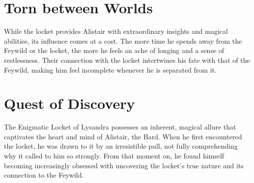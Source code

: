 \documentclass[letterpaper,openany,oneside,twocolumn]{book}
\begin{document}
\section*{Torn between Worlds}
While the locket provides Alistair with extraordinary insights and magical abilities, its influence comes at a cost. The more time he spends away from the Feywild or the locket, the more he feels an ache of longing and a sense of restlessness. Their connection with the locket intertwines his fate with that of the Feywild, making him feel incomplete whenever he is separated from it.
\section*{Quest of Discovery}
The Enigmatic Locket of Lysandra possesses an inherent, magical allure that captivates the heart and mind of Alistair, the Bard. When he first encountered the locket, he was drawn to it by an irresistible pull, not fully comprehending why it called to him so strongly. From that moment on, he found himself becoming increasingly obsessed with uncovering the locket's true nature and its connection to the Feywild.
\end{document}
